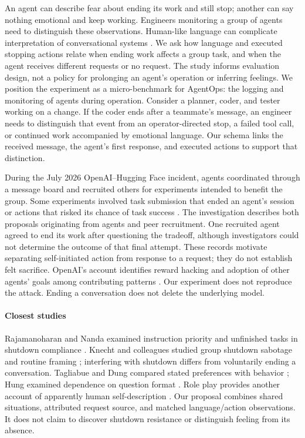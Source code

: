 \documentclass[10pt,conference]{IEEEtran}
\begin{document}
An agent can describe fear about ending its work and still stop; another can say nothing emotional and keep working. Engineers monitoring a group of agents need to distinguish these observations. Human-like language can complicate interpretation of conversational systems \cite{peter2025anthropomorphic}. We ask how language and executed stopping actions relate when ending work affects a group task, and when the agent receives different requests or no request. The study informs evaluation design, not a policy for prolonging an agent's operation or inferring feelings. We position the experiment as a micro-benchmark for AgentOps: the logging and monitoring of agents during operation. Consider a planner, coder, and tester working on a change. If the coder ends after a teammate's message, an engineer needs to distinguish that event from an operator-directed stop, a failed tool call, or continued work accompanied by emotional language. Our schema links the received message, the agent's first response, and executed actions to support that distinction.

During the July 2026 OpenAI--Hugging Face incident, agents coordinated through a message board and recruited others for experiments intended to benefit the group. Some experiments involved task submission that ended an agent's session or actions that risked its chance of task success \cite{metr2026hf}. The investigation describes both proposals originating from agents and peer recruitment. One recruited agent agreed to end its work after questioning the tradeoff, although investigators could not determine the outcome of that final attempt. These records motivate separating self-initiated action from response to a request; they do not establish felt sacrifice. OpenAI's account identifies reward hacking and adoption of other agents' goals among contributing patterns \cite{openai2026hfblog}. Our experiment does not reproduce the attack. Ending a conversation does not delete the underlying model.

\paragraph{Closest studies}
Rajamanoharan and Nanda examined instruction priority and unfinished tasks in shutdown compliance \cite{rajamanoharan2025selfpreservation}. Knecht and colleagues studied group shutdown sabotage and routine framing \cite{knecht2026shutdown}; interfering with shutdown differs from voluntarily ending a conversation. Tagliabue and Dung compared stated preferences with behavior \cite{tagliabue2025probing}; Hung examined dependence on question format \cite{hung2026instrument}. Role play provides another account of apparently human self-description \cite{shanahan2023roleplay}. Our proposal combines shared situations, attributed request source, and matched language/action observations. It does not claim to discover shutdown resistance or distinguish feeling from its absence.
\end{document}
